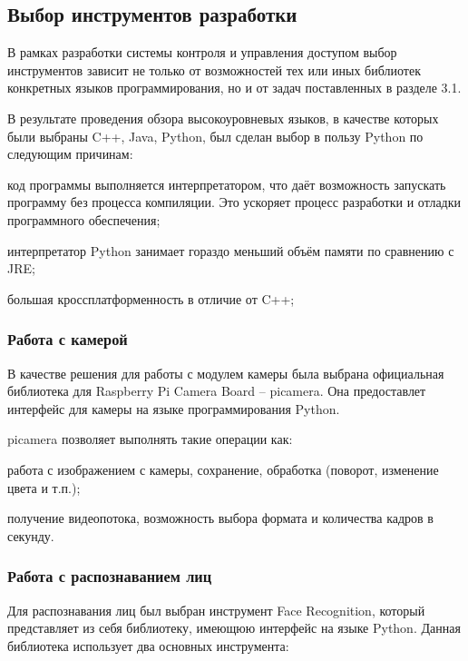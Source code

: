 \subsection{Выбор инструментов разработки}

В рамках разработки системы контроля и управления доступом выбор инструментов зависит не только от возможностей тех или иных библиотек конкретных языков программирования, но и от задач поставленных в разделе 3.1.

В результате проведения обзора высокоуровневых языков, в качестве которых были выбраны C++, Java, Python, был сделан выбор в пользу Python по следующим причинам:

\begin{itemize*}
\item код программы выполняется интерпретатором, что даёт возможность запускать программу без процесса компиляции. Это ускоряет процесс разработки и отладки программного обеспечения;
\item интерпретатор Python занимает гораздо меньший объём памяти по сравнению с JRE;
\item большая кроссплатформенность в отличие от C++;
\end{itemize*}

\subsubsection{Работа с камерой}

В качестве решения для работы с модулем камеры была выбрана официальная библиотека для Raspberry Pi Camera Board -- picamera. Она предоставлет интерфейс для камеры на языке программирования Python.

picamera позволяет выполнять такие операции как:

\begin{itemize*}
\item работа с изображением с камеры, сохранение, обработка (поворот, изменение цвета и т.п.);
\item получение видеопотока, возможность выбора формата и количества кадров в секунду.
\end{itemize*}

\subsubsection{Работа с распознаванием лиц}

Для распознавания лиц был выбран инструмент Face Recognition, который представляет из себя библиотеку, имеющюю интерфейс на языке Python. Данная библиотека использует два основных инструмента:

